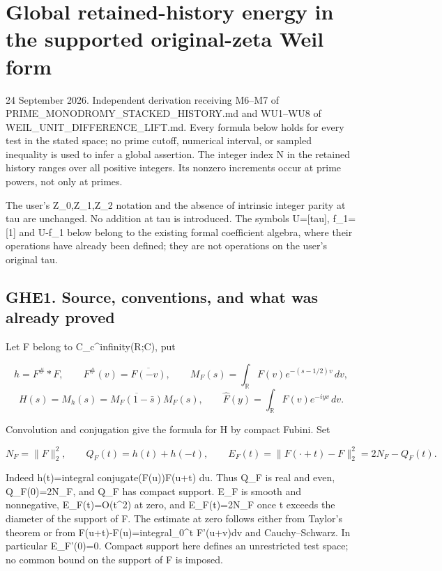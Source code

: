 \section{Global retained-history energy in the supported original-zeta
Weil
form}\label{global-retained-history-energy-in-the-supported-original-zeta-weil-form}

24 September 2026. Independent derivation receiving M6--M7 of
PRIME\_MONODROMY\_STACKED\_HISTORY.md and WU1--WU8 of
WEIL\_UNIT\_DIFFERENCE\_LIFT.md. Every formula below holds for every
test in the stated space; no prime cutoff, numerical interval, or
sampled inequality is used to infer a global assertion. The integer
index N in the retained history ranges over all positive integers. Its
nonzero increments occur at prime powers, not only at primes.

The user's Z\_0,Z\_1,Z\_2 notation and the absence of intrinsic integer
parity at tau are unchanged. No addition at tau is introduced. The
symbols U={[}tau{]}, f\_1={[}1{]} and U-f\_1 below belong to the
existing formal coefficient algebra, where their operations have already
been defined; they are not operations on the user's original tau.

\subsection{GHE1. Source, conventions, and what was already
proved}\label{ghe1.-source-conventions-and-what-was-already-proved}

Let F belong to C\_c\^{}infinity(R;C), put

\[
h=F^\#*F,\qquad F^\#(v)=\overline{F(-v)},\qquad
M_F(s)=\int_{\mathbb R}F(v)e^{-(s-1/2)v}\,dv,
\] \[
H(s)=M_h(s)=\overline{M_F(1-\bar s)}M_F(s),\qquad
\widehat F(y)=\int_{\mathbb R}F(v)e^{-iyv}\,dv.
\tag{GHE1}
\]

Convolution and conjugation give the formula for H by compact Fubini.
Set

\[
N_F=\|F\|_2^2,\qquad Q_F(t)=h(t)+h(-t),\qquad
E_F(t)=\|F(\cdot+t)-F\|_2^2=2N_F-Q_F(t).
\tag{GHE2}
\]

Indeed h(t)=integral conjugate(F(u))F(u+t) du. Thus Q\_F is real and
even, Q\_F(0)=2N\_F, and Q\_F has compact support. E\_F is smooth and
nonnegative, E\_F(t)=O(t\^{}2) at zero, and E\_F(t)=2N\_F once
\textbar t\textbar{} exceeds the diameter of the support of F. The
estimate at zero follows either from Taylor's theorem or from
F(u+t)-F(u)=integral\_0\^{}t F'(u+v)dv and Cauchy--Schwarz. In
particular E\_F'(0)=0. Compact support here defines an unrestricted test
space; no common bound on the support of F is imposed.

